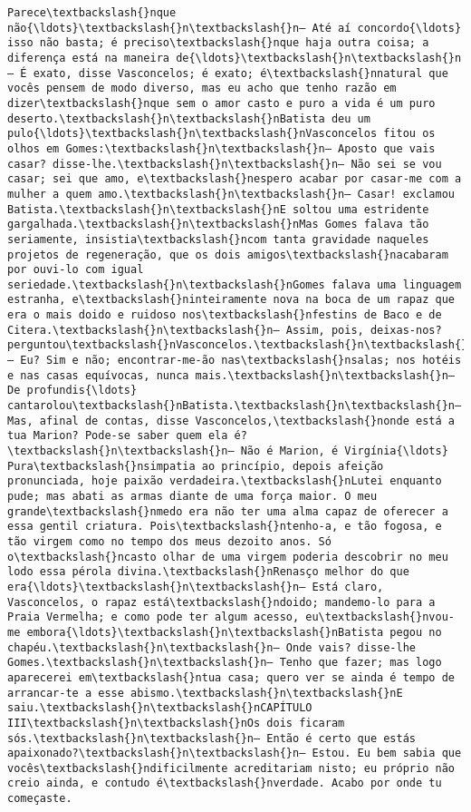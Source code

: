 \begin{Verbatim}[commandchars=\\\{\}]
Parece\textbackslash{}nque não{\ldots}\textbackslash{}n\textbackslash{}n— Até aí concordo{\ldots} isso não basta; é preciso\textbackslash{}nque haja outra coisa; a diferença está na maneira de{\ldots}\textbackslash{}n\textbackslash{}n— É exato, disse Vasconcelos; é exato; é\textbackslash{}nnatural que vocês pensem de modo diverso, mas eu acho que tenho razão em dizer\textbackslash{}nque sem o amor casto e puro a vida é um puro deserto.\textbackslash{}n\textbackslash{}nBatista deu um pulo{\ldots}\textbackslash{}n\textbackslash{}nVasconcelos fitou os olhos em Gomes:\textbackslash{}n\textbackslash{}n— Aposto que vais casar? disse-lhe.\textbackslash{}n\textbackslash{}n— Não sei se vou casar; sei que amo, e\textbackslash{}nespero acabar por casar-me com a mulher a quem amo.\textbackslash{}n\textbackslash{}n— Casar! exclamou Batista.\textbackslash{}n\textbackslash{}nE soltou uma estridente gargalhada.\textbackslash{}n\textbackslash{}nMas Gomes falava tão seriamente, insistia\textbackslash{}ncom tanta gravidade naqueles projetos de regeneração, que os dois amigos\textbackslash{}nacabaram por ouvi-lo com igual seriedade.\textbackslash{}n\textbackslash{}nGomes falava uma linguagem estranha, e\textbackslash{}ninteiramente nova na boca de um rapaz que era o mais doido e ruidoso nos\textbackslash{}nfestins de Baco e de Citera.\textbackslash{}n\textbackslash{}n— Assim, pois, deixas-nos? perguntou\textbackslash{}nVasconcelos.\textbackslash{}n\textbackslash{}n— Eu? Sim e não; encontrar-me-ão nas\textbackslash{}nsalas; nos hotéis e nas casas equívocas, nunca mais.\textbackslash{}n\textbackslash{}n— De profundis{\ldots} cantarolou\textbackslash{}nBatista.\textbackslash{}n\textbackslash{}n— Mas, afinal de contas, disse Vasconcelos,\textbackslash{}nonde está a tua Marion? Pode-se saber quem ela é?\textbackslash{}n\textbackslash{}n— Não é Marion, é Virgínia{\ldots} Pura\textbackslash{}nsimpatia ao princípio, depois afeição pronunciada, hoje paixão verdadeira.\textbackslash{}nLutei enquanto pude; mas abati as armas diante de uma força maior. O meu grande\textbackslash{}nmedo era não ter uma alma capaz de oferecer a essa gentil criatura. Pois\textbackslash{}ntenho-a, e tão fogosa, e tão virgem como no tempo dos meus dezoito anos. Só o\textbackslash{}ncasto olhar de uma virgem poderia descobrir no meu lodo essa pérola divina.\textbackslash{}nRenasço melhor do que era{\ldots}\textbackslash{}n\textbackslash{}n— Está claro, Vasconcelos, o rapaz está\textbackslash{}ndoido; mandemo-lo para a Praia Vermelha; e como pode ter algum acesso, eu\textbackslash{}nvou-me embora{\ldots}\textbackslash{}n\textbackslash{}nBatista pegou no chapéu.\textbackslash{}n\textbackslash{}n— Onde vais? disse-lhe Gomes.\textbackslash{}n\textbackslash{}n— Tenho que fazer; mas logo aparecerei em\textbackslash{}ntua casa; quero ver se ainda é tempo de arrancar-te a esse abismo.\textbackslash{}n\textbackslash{}nE saiu.\textbackslash{}n\textbackslash{}nCAPÍTULO III\textbackslash{}n\textbackslash{}nOs dois ficaram sós.\textbackslash{}n\textbackslash{}n— Então é certo que estás apaixonado?\textbackslash{}n\textbackslash{}n— Estou. Eu bem sabia que vocês\textbackslash{}ndificilmente acreditariam nisto; eu próprio não creio ainda, e contudo é\textbackslash{}nverdade. Acabo por onde tu começaste. 
\end{Verbatim}
